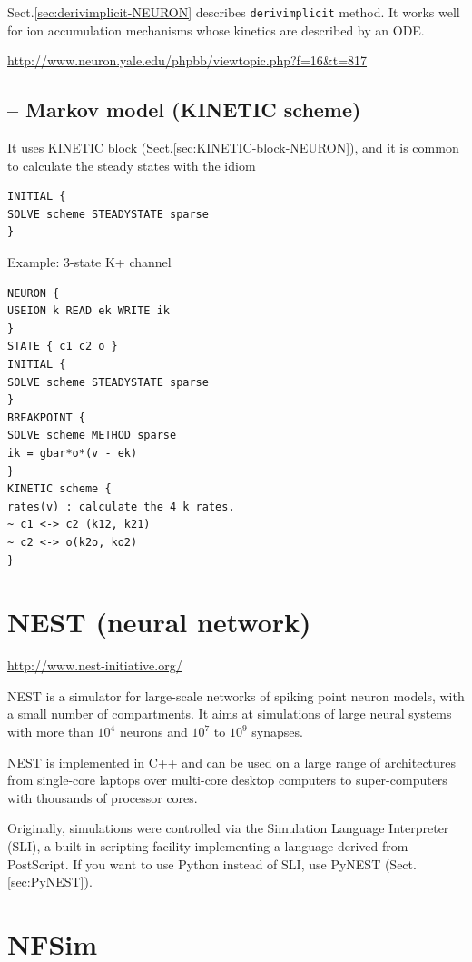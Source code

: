 Sect.\ref{sec:derivimplicit-NEURON} describes \verb!derivimplicit! method.
It works well for ion accumulation mechanisms whose
kinetics are described by an ODE.

\url{http://www.neuron.yale.edu/phpbb/viewtopic.php?f=16&t=817}

\subsection{-- Markov model (KINETIC scheme)}

It uses KINETIC block (Sect.\ref{sec:KINETIC-block-NEURON}), and it is 
common to calculate the steady states with the idiom
\begin{verbatim}
INITIAL {
SOLVE scheme STEADYSTATE sparse
}
\end{verbatim}

Example: 3-state K+ channel
\begin{verbatim}
NEURON {
USEION k READ ek WRITE ik
}
STATE { c1 c2 o }
INITIAL {
SOLVE scheme STEADYSTATE sparse
}
BREAKPOINT {
SOLVE scheme METHOD sparse
ik = gbar*o*(v - ek)
}
KINETIC scheme {
rates(v) : calculate the 4 k rates.
~ c1 <-> c2 (k12, k21)
~ c2 <-> o(k2o, ko2)
}
\end{verbatim}


\section{NEST (neural network)}
\label{sec:NEST}

\url{http://www.nest-initiative.org/}

NEST is a simulator for large-scale networks of spiking point neuron models, 
with a small number of compartments.
It aims at simulations of large neural systems with more than $10^4$ neurons
and $10^7$ to $10^9$ synapses.

NEST is implemented in C++ and can be used on a large range of architectures
from single-core laptops over multi-core desktop computers to super-computers
with thousands of processor cores.

Originally, simulations were controlled via the Simulation Language Interpreter
(SLI), a built-in scripting facility implementing a language derived from
PostScript. If you want to use Python instead of SLI, use PyNEST
(Sect.\ref{sec:PyNEST}).


\section{NFSim}
\label{sec:NFSim}

